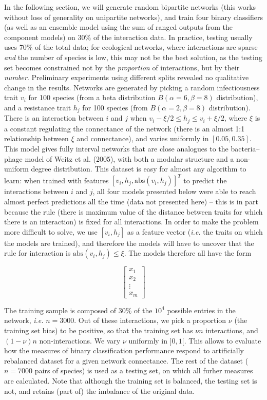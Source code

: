 \documentclass[11pt]{article}
\begin{document}
In the following section, we will generate random bipartite networks
(this works without loss of generality on unipartite networks), and
train four binary classifiers (as well as an ensemble model using the
sum of ranged outputs from the component models) on 30\% of the
interaction data. In practice, testing usually uses 70\% of the total
data; for ecological networks, where interactions are sparse \emph{and}
the number of species is low, this may not be the best solution, as the
testing set becomes constrained not by the \emph{proportion} of
interactions, but by their \emph{number}. Preliminary experiments using
different splits revealed no qualitative change in the results. Networks
are generated by picking a random infectiousness trait \(v_i\) for 100
species (from a beta distribution \(B(\alpha=6,\beta=8)\) distribution),
and a resistance trait \(h_j\) for 100 species (from
\(B(\alpha=2,\beta=8)\) distribution). There is an interaction between
\(i\) and \(j\) when \(v_i-\xi/2 \le h_j \le v_i+\xi/2\), where \(\xi\)
is a constant regulating the connectance of the network (there is an
almost 1:1 relationship between \(\xi\) and connectance), and varies
uniformly in \([0.05, 0.35]\). This model gives fully interval networks
that are close analogues to the bacteria--phage model of Weitz et al.
(2005), with both a modular structure and a non-uniform degree
distribution. This dataset is easy for almost any algorithm to learn:
when trained with features \([v_i, h_j, \text{abs}(v_i, h_j)] ^T\) to
predict the interactions between \(i\) and \(j\), all four models
presented below were able to reach almost perfect predictions all the
time (data not presented here) -- this is in part because the rule
(there is maximum value of the distance between traits for which there
is an interaction) is fixed for all interactions. In order to make the
problem more difficult to solve, we use \([v_i, h_j]\) as a feature
vector (\emph{i.e.} the traits on which the models are trained), and
therefore the models will have to uncover that the rule for interaction
is \(\text{abs}(v_i, h_j) \le \xi\). The models therefore all have the
form

\[
\begin{bmatrix}
           x_{1} \\
           x_{2} \\
           \vdots \\
           x_{m}
         \end{bmatrix}
\]

The training sample is composed of 30\% of the \(10^4\) possible entries
in the network, \emph{i.e.} \(n=3000\). Out of these interactions, we
pick a proportion \(\nu\) (the training set bias) to be positive, so
that the training set has \(\nu n\) interactions, and \((1-\nu) n\)
non-interactions. We vary \(\nu\) uniformly in \(]0,1[\). This allows to
evaluate how the measures of binary classification performance respond
to artificially rebalanced dataset for a given network connectance. The
rest of the dataset (\(n=7000\) pairs of species) is used as a testing
set, on which all furher measures are calculated. Note that although the
training set is balanced, the testing set is not, and retains (part of)
the imbalance of the original data.
\end{document}
